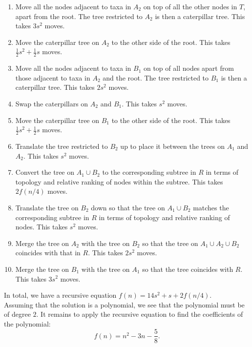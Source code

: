 \documentclass[11pt]{amsart}
\theoremstyle{definition}
\begin{document}
\begin{enumerate}[(1)]
\item Move all the nodes adjacent to taxa in $A_2$ on top of all the other nodes in $T$, apart from the root.
The tree restricted to $A_2$ is then a caterpillar tree.
This takes $3s^2$ moves.

\item Move the caterpillar tree on $A_2$ to the other side of the root.
This takes $\frac12 s^2 + \frac12 s$ moves.

\item Move all the nodes adjacent to taxa in $B_1$ on top of all nodes apart from those adjacent to taxa in $A_2$ and the root.
The tree restricted to $B_1$ is then a caterpillar tree.
This takes $2s^2$ moves.

\item Swap the caterpillars on $A_2$ and $B_1$.
This takes $s^2$ moves.

\item Move the caterpillar tree on $B_1$ to the other side of the root.
This takes $\frac12 s^2 + \frac12 s$ moves.

\item Translate the tree restricted to $B_2$ up to place it between the trees on $A_1$ and $A_2$.
This takes $s^2$ moves.

\item Convert the tree on $A_1 \cup B_2$ to the corresponding subtree in $R$ in terms of topology and relative ranking of nodes within the subtree.
This takes $2f(n/4)$ moves.

\item Translate the tree on $B_2$ down so that the tree on $A_1 \cup B_2$ matches the corresponding subtree in $R$ in terms of topology and relative ranking of nodes.
This takes $s^2$ moves.

\item Merge the tree on $A_2$ with the tree on $B_2$ so that the tree on $A_1 \cup A_2 \cup B_2$ coincides with that in $R$.
This takes $2s^2$ moves.

\item Merge the tree on $B_1$ with the tree on $A_1$ so that the tree coincides with $R$.
This takes $3s^2$ moves.
\end{enumerate}

In total, we have a recursive equation $f(n) = 14s^2 + s + 2 f(n/4)$.\\
Assuming that the solution is a polynomial, we see that the polynomial must be of degree $2$.
It remains to apply the recursive equation to find the coefficients of the polynomial:
\[
f(n) = n^2 - 3n - \frac 58.
\]
\end{document}
